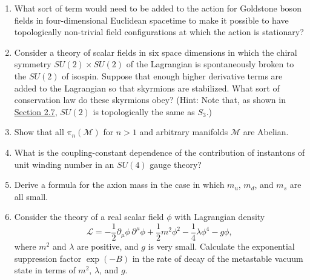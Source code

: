 

\begin{enumerate}
\item What sort of term would need to be added to the action for Goldstone
boson fields in four-dimensional Euclidean spacetime to make it possible to
have topologically non-trivial field configurations at which the action is
stationary?

\item Consider a theory of scalar fields in six space dimensions in which
the chiral symmetry $SU(2)\times SU(2)$ of the Lagrangian is spontaneously
broken to the $SU(2)$ of isospin. Suppose that enough higher derivative
terms are added to the Lagrangian so that skyrmions are stabilized. What
sort of conservation law do these skyrmions obey? (Hint: Note that, as
shown in \hyperref[sec:2.7]{Section 2.7}, $SU(2)$ is topologically the same
as $S_3$.)

\item Show that all $\pi_n(\mathcal M)$ for $n>1$ and arbitrary manifolds
$\mathcal M$ are Abelian.

\item What is the coupling-constant dependence of the contribution of
instantons of unit winding number in an $SU(4)$ gauge theory?

\item Derive a formula for the axion mass in the case in which $m_u$,
$m_d$, and $m_s$ are all small.

\item Consider the theory of a real scalar field $\phi$ with Lagrangian
density
\[
 \mathcal L=-\frac12\partial_\mu\phi\,\partial^\mu\phi
 +\frac12m^2\phi^2-\frac14\lambda\phi^4-g\phi,
\]
where $m^2$ and $\lambda$ are positive, and $g$ is very small. Calculate
the exponential suppression factor $\exp(-B)$ in the rate of decay of the
metastable vacuum state in terms of $m^2$, $\lambda$, and $g$.
\end{enumerate}


